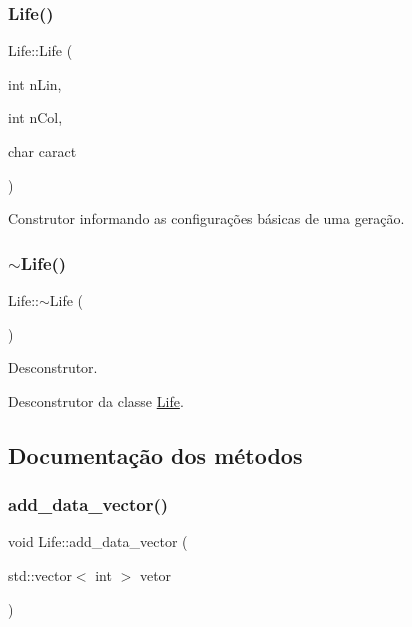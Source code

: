 \subsubsection{\texorpdfstring{Life()}{Life()}\hspace{0.1cm}{\footnotesize\ttfamily [2/2]}}
{\footnotesize\ttfamily Life\+::\+Life (\begin{DoxyParamCaption}\item[{int}]{n\+Lin,  }\item[{int}]{n\+Col,  }\item[{char}]{caract }\end{DoxyParamCaption})\hspace{0.3cm}{\ttfamily [inline]}}



Construtor informando as configurações básicas de uma geração. 

\mbox{\label{classLife_ac5a521e06906fb4f834001b2b4f7adc7}} 
\subsubsection{\texorpdfstring{$\sim$\+Life()}{~Life()}}
{\footnotesize\ttfamily Life\+::$\sim$\+Life (\begin{DoxyParamCaption}{ }\end{DoxyParamCaption})}



Desconstrutor. 

Desconstrutor da classe \hyperlink{classLife}{Life}. 

\subsection{Documentação dos métodos}
\mbox{\label{classLife_a4f2c49e28b51d83ea625b448ac5aa7bb}} 
\subsubsection{\texorpdfstring{add\+\_\+data\+\_\+vector()}{add\_data\_vector()}}
{\footnotesize\ttfamily void Life\+::add\+\_\+data\+\_\+vector (\begin{DoxyParamCaption}\item[{std\+::vector$<$ int $>$}]{vetor }\end{DoxyParamCaption})}



